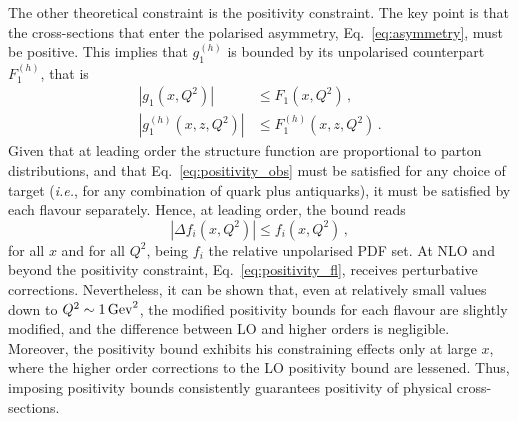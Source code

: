 The other theoretical constraint is the positivity constraint. The key point is that the cross-sections that enter the polarised asymmetry, Eq.~\eqref{eq:asymmetry}, must be positive. This implies that $g_1^{(h)}$ is bounded by its unpolarised counterpart $F_1^{(h)}$, that is
\begin{equation}
  \begin{split}
    \left| g_1 (x,Q^2)  \right|& \leq F_1(x, Q^2) \,,\\
    \left| g_1^{(h)} (x,z,Q^2)  \right|& \leq F_1^{(h)}(x, z, Q^2) \,.
  \end{split}
  \label{eq:positivity_obs}
\end{equation}
Given that at leading order the structure function are proportional to parton distributions, and that Eq.~\eqref{eq:positivity_obs} must be satisfied for any choice of target (\textit{i.e.}, for any combination of quark plus antiquarks), it must be satisfied by each flavour separately. Hence, at leading order, the bound reads
\begin{equation}
  \left| \Delta f_i (x,Q^2) \right| \leq f_i (x,Q^2) \,,
  \label{eq:positivity_fl}
\end{equation}
for all $x$ and for all $Q^2$, being $f_i$ the relative unpolarised PDF set. At NLO and beyond the positivity constraint, Eq.~\eqref{eq:positivity_fl}, receives perturbative corrections. Nevertheless, it can be shown \cite{Altarelli:1998gn} that, even at relatively small values down to $Q^2 \sim 1 \, \textrm{Gev}^2$, the modified positivity bounds for each flavour are slightly modified, and the difference between LO and higher orders is negligible. Moreover, the positivity bound exhibits his constraining effects only at large $x$, where the higher order corrections to the LO positivity bound are lessened. Thus, imposing positivity bounds consistently guarantees positivity of physical cross-sections.%

